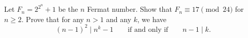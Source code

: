 \begin{challenge}
  \exercise Let $F_n=2^{2^n}+1$ be the $n$\supth{} Fermat number. Show that $F_n\equiv 17\pmod{24}$ for $n\geq 2$.
  \exercise Prove that for any $n>1$ and any $k$, we have
  \begin{equation*}
    (n-1)^2\mid n^k-1\qquad\text{if and only if}\qquad n-1\mid k.
  \end{equation*}
\end{challenge}

